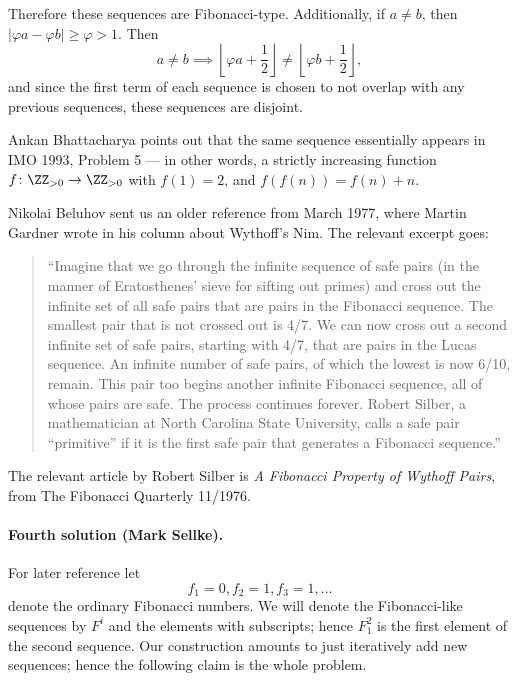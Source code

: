 Therefore these sequences are Fibonacci-type. Additionally, if $a \neq b$, then $|\varphi a - \varphi b| \ge \varphi > 1$. Then \[a \neq b \implies \left \lfloor \varphi a + \frac{1}{2} \right \rfloor \neq \left \lfloor \varphi b + \frac{1}{2} \right \rfloor,\]
and since the first term of each sequence is chosen to not overlap with any previous sequences, these sequences are disjoint.

\begin{remark*}
  Ankan Bhattacharya points out that the same sequence
  essentially appears in IMO 1993, Problem 5 --- in other words,
  a strictly increasing function $f \colon \ZZ_{>0} \to \ZZ_{>0}$ with $f(1) = 2$,
  and $f(f(n)) = f(n) + n$.

  Nikolai Beluhov sent us an older reference from March 1977,
  where Martin Gardner wrote in his column about Wythoff's Nim.
  The relevant excerpt goes:
  \begin{quote}
    ``Imagine that we go through the infinite sequence of safe pairs (in
    the manner of Eratosthenes' sieve for sifting out primes) and cross
    out the infinite set of all safe pairs that are pairs in the Fibonacci
    sequence. The smallest pair that is not crossed out is 4/7. We can now
    cross out a second infinite set of safe pairs, starting with 4/7, that
    are pairs in the Lucas sequence. An infinite number of safe pairs, of
    which the lowest is now 6/10, remain. This pair too begins another
    infinite Fibonacci sequence, all of whose pairs are safe. The process
    continues forever. Robert Silber, a mathematician at North Carolina
    State University, calls a safe pair ``primitive'' if it is the first
    safe pair that generates a Fibonacci sequence.''
  \end{quote}
  The relevant article by Robert Silber is
  \emph{A Fibonacci Property of Wythoff Pairs},
  from The Fibonacci Quarterly 11/1976.
\end{remark*}


\paragraph{Fourth solution (Mark Sellke).}
For later reference let \[ f_1=0, f_2=1, f_3=1, \dots \]
denote the ordinary Fibonacci numbers.
We will denote the Fibonacci-like sequences by $F^i$ and the elements with subscripts;
hence $F^2_1$ is the first element of the second sequence.
Our construction amounts to just iteratively add new sequences;
hence the following claim is the whole problem.

